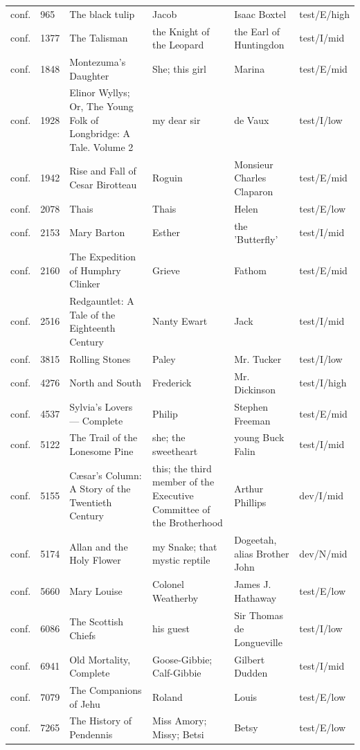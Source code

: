 \documentclass[11pt]{article}
\begin{document}
{\begin{longtable}{p{0.9cm}p{0.9cm}p{4.0cm}p{3.3cm}p{3.0cm}p{1.8cm}}
conf. & 965 & The black tulip & Jacob & Isaac Boxtel & test/E/high \\
conf. & 1377 & The Talisman & the Knight of the Leopard & the Earl of Huntingdon & test/I/mid \\
conf. & 1848 & Montezuma's Daughter & She; this girl & Marina & test/E/mid \\
conf. & 1928 & Elinor Wyllys; Or, The Young Folk of Longbridge: A Tale. Volume 2 & my dear sir & de Vaux & test/I/low \\
conf. & 1942 & Rise and Fall of Cesar Birotteau & Roguin & Monsieur Charles Claparon & test/E/mid \\
conf. & 2078 & Thais & Thais & Helen & test/E/low \\
conf. & 2153 & Mary Barton & Esther & the 'Butterfly' & test/I/mid \\
conf. & 2160 & The Expedition of Humphry Clinker & Grieve & Fathom & test/E/mid \\
conf. & 2516 & Redgauntlet: A Tale of the Eighteenth Century & Nanty Ewart & Jack & test/I/mid \\
conf. & 3815 & Rolling Stones & Paley & Mr. Tucker & test/I/low \\
conf. & 4276 & North and South & Frederick & Mr. Dickinson & test/I/high \\
conf. & 4537 & Sylvia's Lovers — Complete & Philip & Stephen Freeman & test/E/mid \\
conf. & 5122 & The Trail of the Lonesome Pine & she; the sweetheart & young Buck Falin & test/I/mid \\
conf. & 5155 & Cæsar's Column: A Story of the Twentieth Century & this; the third member of the Executive Committee of the Brotherhood & Arthur Phillips & dev/I/mid \\
conf. & 5174 & Allan and the Holy Flower & my Snake; that mystic reptile & Dogeetah, alias Brother John & dev/N/mid \\
conf. & 5660 & Mary Louise & Colonel Weatherby & James J. Hathaway & test/E/low \\
conf. & 6086 & The Scottish Chiefs & his guest & Sir Thomas de Longueville & test/I/low \\
conf. & 6941 & Old Mortality, Complete & Goose-Gibbie; Calf-Gibbie & Gilbert Dudden & test/I/mid \\
conf. & 7079 & The Companions of Jehu & Roland & Louis & test/E/low \\
conf. & 7265 & The History of Pendennis & Miss Amory; Missy; Betsi & Betsy & test/E/low \\

\end{longtable}}
\end{document}
